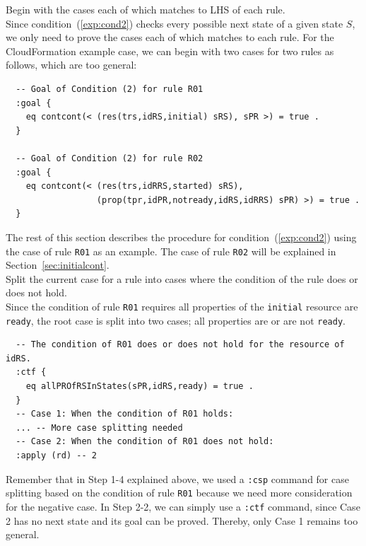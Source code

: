 \documentclass[12pt]{report}
\begin{document}
 Begin with the cases each of which matches to
LHS of each rule. \\
Since condition~(\ref{exp:cond2}) checks every possible next state of
a given state $S$, we only need to prove the cases each of which
matches to each rule. For the CloudFormation example case, we can
begin with two cases for two rules as follows, which are too general:
\small
\begin{verbatim}
  -- Goal of Condition (2) for rule R01
  :goal {
    eq contcont(< (res(trs,idRS,initial) sRS), sPR >) = true .
  }

  -- Goal of Condition (2) for rule R02
  :goal {
    eq contcont(< (res(trs,idRRS,started) sRS),
                  (prop(tpr,idPR,notready,idRS,idRRS) sPR) >) = true .
  }
\end{verbatim}
\normalsize

The rest of this section describes the procedure for condition~(\ref{exp:cond2})
using the case of rule {\tt R01} as an example. The case of rule {\tt R02} will
be explained in Section~\ref{sec:initialcont}.\\

 Split the current case for a rule into
cases where the condition of the rule does or does not hold. \\
Since the condition of rule {\tt R01} requires all properties of the
{\tt initial} resource are {\tt ready}, the root case is split into
two cases; all properties are or are not {\tt ready}.
\small
\begin{verbatim}
  -- The condition of R01 does or does not hold for the resource of idRS.
  :ctf {
    eq allPROfRSInStates(sPR,idRS,ready) = true .
  }
  -- Case 1: When the condition of R01 holds:
  ... -- More case splitting needed
  -- Case 2: When the condition of R01 does not hold:
  :apply (rd) -- 2
\end{verbatim}
\normalsize
Remember that in Step 1-4 explained above, we used a {\tt :csp}
command for case splitting based on the condition of rule {\tt R01}
because we need more consideration for the negative case.  In Step
2-2, we can simply use a {\tt :ctf} command, since Case 2 has no next
state and its goal can be proved. Thereby, only Case 1 remains too
general. \\
\end{document}
